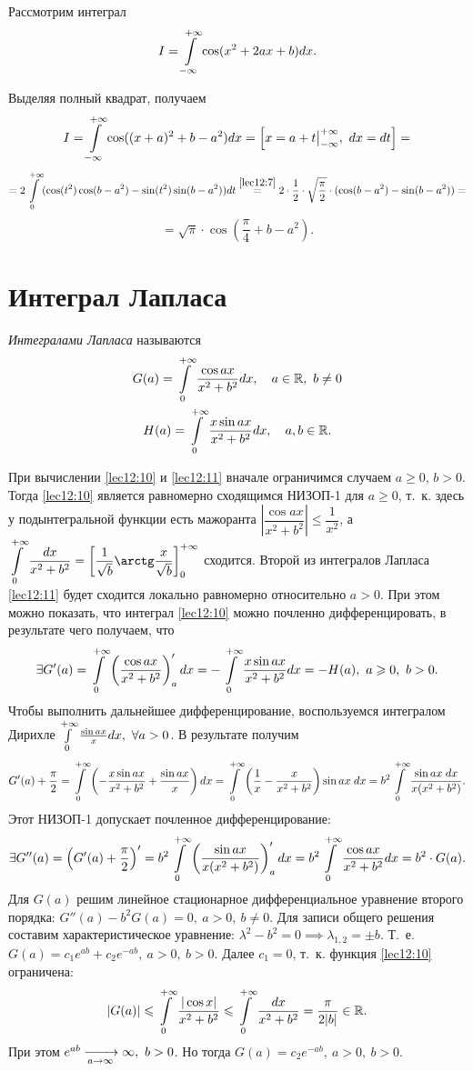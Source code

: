 \documentclass[../../main.tex]{subfiles}
\begin{document}
\begin{exmp}
Рассмотрим интеграл \[I = \int\limits_{-\infty}^{+\infty} \cos(x^2 + 2ax + b) dx.\]

Выделяя полный квадрат, получаем \[I = \int\limits_{-\infty}^{+\infty} \cos((x+a)^2 + b - a^2)dx = 
\left[x = a + t\big|_{-\infty}^{+\infty},\ dx = dt\right] =\]\[= 2 \ioinf 
(\cos(t^2)\cos(b-a^2) - \sin(t^2)\sin(b-a^2)) dt \stk{lec12:7}= 
2\cdot\frac12\cdot \sqrt{\frac\pi2} \cdot (\cos(b - a^2) - \sin(b - a^2)) 
=\]\[ = \sqrt{\pi} \cdot\cos\left(\frac{\pi}4 + b - a^2\right).\]
\end{exmp}

\section{Интеграл Лапласа}

\emph{Интегралами Лапласа} называются
\begin{gather}
\label{lec12:10}
G(a) = \int\limits_{0}^{+\infty} \frac{\cos ax}{x^2 + b^2} dx,\quad a \in \mathbb{R},\ b \ne 0 \\
\label{lec12:11}
H(a) = \int\limits_{0}^{+\infty} \frac{x\sin ax}{x^2 + b^2} dx,\quad a, b \in \mathbb{R}. 
\end{gather}

При вычислении \eqref{lec12:10} и \eqref{lec12:11} вначале ограничимся случаем 
$a \ge 0$, $b > 0$. Тогда \eqref{lec12:10} является равномерно сходящимся 
НИЗОП-1 для $a \ge 0$, т.~к. здесь у подынтегральной функции есть мажоранта 
$\left|\dfrac{\cos{ax}}{x^2 + b^2}\right| \le \dfrac1{x^2}$, а 
$\displaystyle\ioinf \frac{dx}{x^2 + b^2} = \left[\frac1{\sqrt b}\arctg\frac 
x{\sqrt b}\right]_0^{+\infty}$ сходится. Второй из интегралов Лапласа 
\eqref{lec12:11} будет сходится локально равномерно относительно $a > 0$. При 
этом можно показать, что интеграл \eqref{lec12:10}  можно почленно 
дифференцировать, в результате чего получаем, что
\[\exists G'(a) = \int\limits_{0}^{+\infty} \left(\frac{\cos ax}{x^2 + b^2}\right)'_a dx = 
-\int\limits_{0}^{+\infty} \frac{x\sin ax}{x^2+b^2} dx = -H(a),\ a \geqslant 0,\ b > 0.\]
Чтобы выполнить дальнейшее дифференцирование, воспользуемся интегралом Дирихле 
$\int\limits_{0}^{+\infty} \frac{\sin ax}x dx,\ \forall a > 0$. В результате получим \[G'(a) + 
\frac\pi2 = \int\limits_{0}^{+\infty} \left(-\frac{x \sin ax}{x^2 + b^2} + \frac{\sin 
ax}{x}\right)dx = \int\limits_{0}^{+\infty} \left(\frac1x - \frac{x}{x^2+b^2}\right)\sin ax\;dx = 
b^2 \int\limits_{0}^{+\infty} \frac{\sin ax\;dx}{x(x^2 + b^2)}.\]
Этот НИЗОП-1 допускает почленное дифференцирование:
\[\exists G''(a) = \left(G'(a) + \frac{\pi}2\right)' = b^2 \int\limits_{0}^{+\infty} 
\left(\frac{\sin ax} {x(x^2 + b^2)}\right)'_a dx = b^2 \int\limits_{0}^{+\infty} \frac{\cos ax} 
{x^2 + b^2} dx = b^2\cdot G(a).\]
Для $G(a)$ решим линейное стационарное дифференциальное уравнение второго 
порядка: $G''(a) - b^2G(a) = 0,\ a > 0,\ b \ne 0$. Для записи общего решения 
составим характеристическое уравнение: $\lambda^2 - b^2 = 0 \implies 
\lambda_{1, 2} = \pm b$. Т.~е. $G(a) = c_1e^{ab} + c_2e^{-ab},\ a > 0,\ b > 
0$. Далее $c_1 = 0$, т.~к. функция \eqref{lec12:10} ограничена:
\[|G(a)| \leqslant \int\limits_{0}^{+\infty} \frac{|\cos x|}{x^2 + b^2} \leqslant \int\limits_{0}^{+\infty} \frac{dx}{x^2 + b^2} 
= \frac\pi{2|b|} \in \mathbb{R}.\] При этом $e^{ab} \xrightarrow[a\to \infty]{} \infty,\ b>0$. 
Но тогда $G(a) = c_2e^{-ab},\ a > 0,\ b > 0$.
\end{document}

